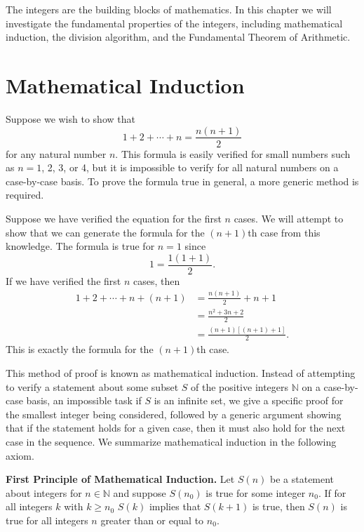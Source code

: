 

 
 
The integers are the building blocks of mathematics. In this chapter we will investigate  the fundamental properties of the integers, including mathematical induction, the division algorithm, and the Fundamental Theorem of Arithmetic.


\section{Mathematical Induction}\label{integers:math_induction}

Suppose we wish to show that
\[
1 + 2 + \cdots + n = \frac{n(n + 1)}{2}
\]
for any natural number $n$. This formula is easily  verified for small numbers such as $n = 1$, 2, 3, or 4, but it is impossible to verify for all natural numbers on a case-by-case basis.  To prove the formula true in general, a more generic method is required.

Suppose we have verified the equation for the first $n$ cases.  We will attempt to show that we can generate the formula for the $(n + 1)$th case from this knowledge.  The formula is true for $n = 1$ since 
\[
1 = \frac{1(1 + 1)}{2}.
\]
If we have verified the first $n$ cases, then
\begin{align*}
1 + 2 + \cdots + n + (n + 1) & = \frac{n(n + 1)}{2} + n + 1 \\
& = \frac{n^2 + 3n + 2}{2} \\
& = \frac{(n + 1)[(n + 1) + 1]}{2}.
\end{align*}
This is exactly the formula for the $(n + 1)$th case.
 
This method of proof is known as {\bfi mathematical induction}.  Instead of attempting to verify a statement about some subset $S$ of the positive integers ${\mathbb N}$ on a case-by-case basis, an impossible task if $S$ is an infinite set, we give a specific proof for the smallest integer being considered, followed by a generic argument showing that if the statement holds for a given case, then it must also hold for the next  case in the sequence.  We summarize mathematical induction in the following axiom. 

\medskip

\noindent
{\bf First Principle of Mathematical Induction.} 
Let $S(n)$ be a statement about integers for  $n \in {\mathbb N}$ and suppose $S(n_0)$ is true for some integer $n_0$.  If for all integers $k$ with $k \geq n_0$ $S(k)$ implies that $S(k+1)$ is true, then $S(n)$ is true for all integers $n$ greater than or equal to $n_0$.  

